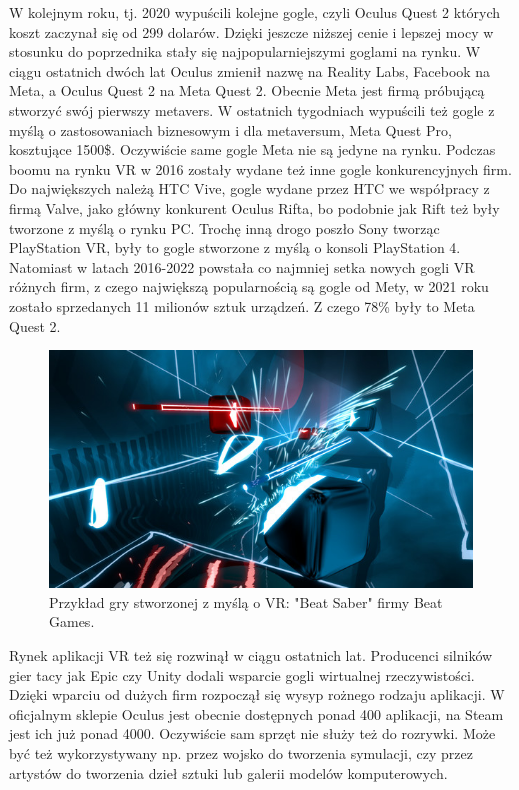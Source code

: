 \documentclass[a4paper,12pt,reqno]{article}
\begin{document}
W kolejnym roku, tj. 2020 wypuścili kolejne gogle, czyli Oculus Quest 2 których 
koszt zaczynał się od 299 dolarów. Dzięki jeszcze niższej cenie i lepszej mocy w 
stosunku do poprzednika stały się najpopularniejszymi goglami na rynku. W ciągu 
ostatnich dwóch lat Oculus zmienił nazwę na Reality Labs, Facebook na Meta, a Oculus 
Quest 2 na Meta Quest 2. Obecnie Meta jest firmą próbującą stworzyć swój pierwszy 
metavers. W ostatnich tygodniach wypuścili też gogle z myślą o zastosowaniach 
biznesowym i dla metaversum, Meta Quest Pro, kosztujące 1500\$. Oczywiście same 
gogle Meta nie są jedyne na rynku. Podczas boomu na rynku VR w 2016 zostały wydane 
też inne gogle konkurencyjnych firm. Do największych należą HTC Vive, gogle wydane 
przez HTC we współpracy z firmą Valve, jako główny konkurent Oculus Rifta, bo 
podobnie jak Rift też były tworzone z myślą o rynku PC. Trochę inną drogo poszło 
Sony tworząc PlayStation VR, były to gogle stworzone z myślą o konsoli PlayStation 
4. Natomiast w latach 2016-2022 powstała co najmniej setka nowych gogli VR różnych 
firm\cite{ilosc_urzadzen}, z czego największą popularnością są gogle od 
Mety\cite{popularnosc_gogli}, w 2021 roku zostało sprzedanych 11 milionów sztuk 
urządzeń. Z czego 78\% były to Meta Quest 2\cite{ilosc_urzadzen}.

\begin{figure}[!ht]%
\centering
\includegraphics[width=0.8\columnwidth]{graphics/BeatSaber.jpg}
\caption{Przykład gry stworzonej z myślą o VR: "Beat Saber" firmy Beat Games.
\label{OpenBrush}}%
%
\qquad
\end{figure}  


Rynek aplikacji VR też się rozwinął w ciągu ostatnich lat. Producenci silników gier tacy 
jak Epic czy Unity dodali
wsparcie gogli wirtualnej rzeczywistości. Dzięki wparciu od dużych firm rozpoczął się wysyp rożnego rodzaju aplikacji. W oficjalnym sklepie Oculus jest obecnie dostępnych ponad 400 
aplikacji\cite{liczba_gier_quest}, na Steam jest ich już ponad 
4000\cite{liczba_gier_steam}. Oczywiście sam sprzęt nie służy też do rozrywki. Może 
być też wykorzystywany np. przez wojsko do tworzenia symulacji, czy przez artystów 
do tworzenia dzieł sztuki lub galerii modelów komputerowych.
\end{document}
